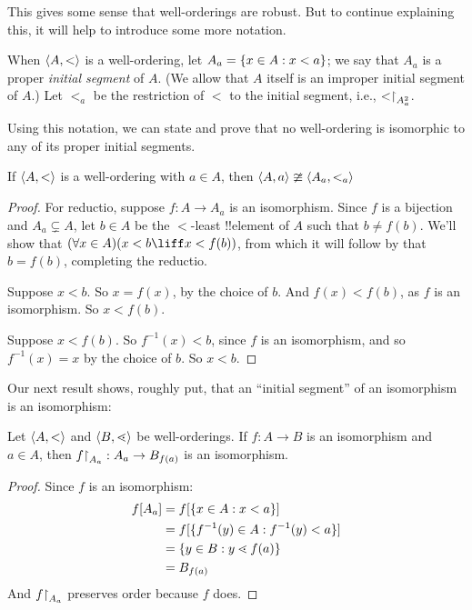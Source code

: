 \documentclass[../../../include/open-logic-section]{subfiles}
\begin{document}
This gives some sense that well-orderings are robust. But to continue
explaining this, it will help to introduce some more notation. 

\begin{defn}
When $\langle A, < \rangle$ is a well-ordering, let $A_a = \{ x \in A : x
< a \}$; we say that $A_a$ is a proper \emph{initial segment} of $A$.
(We allow that $A$ itself is an improper initial segment of $A$.) Let
$<_a$ be the restriction of $<$ to the initial segment, i.e.,
$\mathord{<}\mathord{\restriction}_{A_a^2}$. 
\end{defn}

Using this notation, we can state and prove that no well-ordering is
isomorphic to any of its proper initial segments.

\begin{lem}
If $\langle A, < \rangle$ is a well-ordering with $a \in A$, then
$\langle A, a \rangle \ncong \langle A_a, <_a \rangle$ 
\end{lem}

\begin{proof}
For reductio, suppose $f \colon A \to A_a$ is an isomorphism. Since
$f$ is a bijection and $A_a \subsetneq A$, let $b \in A$ be the
$<$-least !!{element} of $A$ such that $b \neq f(b)$. We'll show that
$(\forall x \in A)(x<b \liff x < f(b))$, from which it will follow by
 that $b =
f(b)$, completing the reductio.

Suppose $x < b$. So $x = f(x)$, by the choice of $b$. And $f(x) <
f(b)$, as $f$ is an isomorphism. So $x < f(b)$.

Suppose $x < f(b)$. So $f^{-1}(x) < b$, since $f$ is an isomorphism,
and so $f^{-1}(x) = x$ by the choice of $b$. So $x < b$. 
\end{proof}

Our next result shows, roughly put, that an ``initial segment'' of an
isomorphism is an isomorphism:

\begin{lem}
Let $\langle A, < \rangle$ and $\langle B, \lessdot \rangle$ be well-orderings. If $f
\colon A \to B$ is an isomorphism and $a \in A$, then
$f\mathord{\restriction}_{A_{a}} : A_a \to B_{f(a)}$ is an isomorphism.
\end{lem}

\begin{proof}
Since $f$ is an isomorphism:
\begin{align*}
	\funimage{f}{A_a} &= \funimage{f}{\Setabs{x \in A}{x < a}}\\
	&= \funimage{f}{\Setabs{f^{-1}(y) \in A}{f^{-1}(y) < a}} \\
	&= \Setabs{y \in B}{y \lessdot f(a)} \\
	&=B_{f(a)} 
\end{align*}
And $f\mathord{\restriction}_{A_a}$ preserves order because $f$ does. 
\end{proof}
\end{document}
